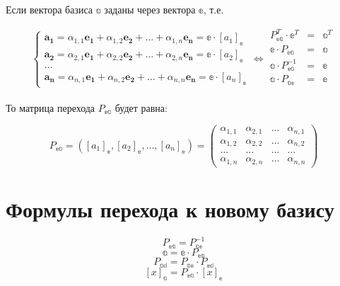 Если вектора базиса $\mathbb{a}$ заданы через вектора $\mathbb{e}$, т.е.

\begin{equation*} 
	\begin{cases}
		\boldsymbol{a_1} = \alpha_{1,1}\boldsymbol{e_1} + \alpha_{1,2}\boldsymbol{e_2} + \dots + \alpha_{1,n}\boldsymbol{e_n} = \mathbb{e} \cdot [a_1]_\mathbb{e} \\
		\boldsymbol{a_2} = \alpha_{2,1}\boldsymbol{e_1} + \alpha_{2,2}\boldsymbol{e_2} + \dots + \alpha_{2,n}\boldsymbol{e_n} = \mathbb{e} \cdot [a_2]_\mathbb{e} \\
		\dots \\
		\boldsymbol{a_n} = \alpha_{n,1}\boldsymbol{e_1} + \alpha_{n,2}\boldsymbol{e_2} + \dots + \alpha_{n,n}\boldsymbol{e_n} = \mathbb{e} \cdot [a_n]_\mathbb{e}
	\end{cases}
	\Leftrightarrow
	\begin{matrix}
		P_\mathbb{ea}^T \cdot \mathbb{e}^T& =& \mathbb{a}^T \\
		\mathbb{e} \cdot P_\mathbb{ea}& =& \mathbb{a}\\
		\mathbb{a} \cdot P_\mathbb{ea}^{-1}& =& \mathbb{e}\\
		\mathbb{a} \cdot P_\mathbb{ae}& =& \mathbb{e}\\
	\end{matrix}
\end{equation*} 

То матрица перехода $P_\mathbb{ea}$ будет равна:

\[
P_\mathbb{ea} = 
\left([a_1]_\mathbb{e}, [a_2]_\mathbb{e}, \dots, [a_n]_\mathbb{e}\right) = 
\begin{pmatrix}
	\alpha_{1,1}& \alpha_{2, 1}& \dots& \alpha_{n,1}\\
	\alpha_{1,2}& \alpha_{2, 2}& \dots& \alpha_{n,2}\\
	\dots& \dots& \dots& \dots\\
	\alpha_{1,n}& \alpha_{2, n}& \dots& \alpha_{n,n}
\end{pmatrix}
\]

\section{Формулы перехода к новому базису}

$$ P_\mathbb{ea} = P_\mathbb{ae}^{-1} $$
$$ \mathbb{a} = \mathbb{e} \cdot P_\mathbb{ea} $$
$$ P_\mathbb{ad} = P_\mathbb{ae}\cdot P_\mathbb{ed} $$
$$ [x]_\mathbb{a} = P_\mathbb{ea} \cdot [x]_\mathbb{e} $$

